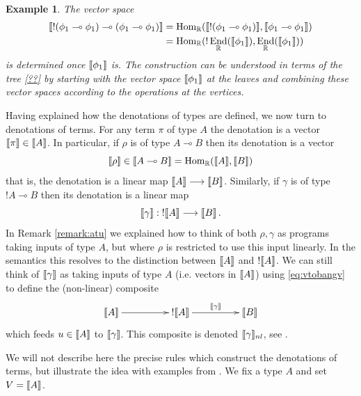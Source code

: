 \documentclass[english,letter paper,12pt,leqno]{article}
\theoremstyle{example}
\newtheorem{example}[theorem]{Example}
\numberwithin{equation}{section}
\def\Hom{\operatorname{Hom}}
\def\be{\begin{equation}}
\def\ee{\end{equation}}
\DeclareMathOperator{\End}{End}
\begin{document}
\begin{example}\label{example:denotation_intaphi} The vector space
\begin{align*}
\den{{!}( \phi_1 \multimap \phi_1 ) \multimap (\phi_1 \multimap \phi_1) } &= \Hom_{\mathbb{R}}( \den{{!}(\phi_1 \multimap \phi_1)}, \den{\phi_1 \multimap \phi_1})\\
&= \Hom_{\mathbb{R}}( {!} \End_{\mathbb{R}}(\den{\phi_1}), \End_{\mathbb{R}}(\den{\phi_1}))
\end{align*}
is determined once $\llbracket \phi_1 \rrbracket$ is. The construction can be understood in terms of the tree \eqref{??} by starting with the vector space $\llbracket \phi_1 \rrbracket$ at the leaves and combining these vector spaces according to the operations at the vertices.
\end{example}

Having explained how the denotations of types are defined, we now turn to denotations of terms. For any term $\pi$ of type $A$ the denotation is a vector $\llbracket \pi \rrbracket \in \llbracket A \rrbracket$. In particular, if $\rho$ is of type $A \multimap B$ then its denotation is a vector
\[
\den{\rho} \in \den{A \multimap B} = \Hom_{\mathbb{R}}(\den{A}, \den{B})
\]
that is, the denotation is a linear map $\llbracket A \rrbracket \longrightarrow \llbracket B \rrbracket$. Similarly, if $\gamma$ is of type ${!}A \multimap B$ then its denotation is a linear map
\[
\llbracket \gamma \rrbracket: {!} \llbracket A \rrbracket \longrightarrow \llbracket B \rrbracket\,.
\]
In Remark \ref{remark:atu} we explained how to think of both $\rho, \gamma$ as programs taking inputs of type $A$, but where $\rho$ is restricted to use this input linearly. In the semantics this resolves to the distinction between $\llbracket A \rrbracket$ and ${!} \llbracket A \rrbracket$. We can still think of $\llbracket \gamma \rrbracket$ as taking inputs of type $A$ (i.e. vectors in $\llbracket A \rrbracket$) using \eqref{eq:vtobangv} to define the (non-linear) composite
\be\label{eq:defnnl}
\xymatrix@C+2pc{
\den{A} \ar[r] & {!} \den{A} \ar[r]^-{\den{\gamma}} & \den{B}
}
\ee
which feeds $u \in \llbracket A \rrbracket$ to $\llbracket \gamma \rrbracket$. This composite is denoted $\llbracket \gamma \rrbracket_{nl}$, see \cite[Definition 5.10]{murfet_ll}.

We will not describe here the precise rules which construct the denotations of terms, but illustrate the idea with examples from \cite[\S 3]{murfetclift}. We fix a type $A$ and set $V = \llbracket A \rrbracket$.
\end{document}
